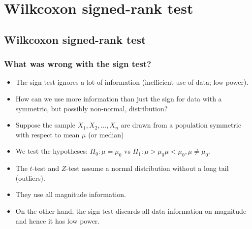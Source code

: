 \documentclass[a4paper]{article}
\begin{document}
\section{Wilkcoxon signed-rank test}\label{sec:14}
\subsection{Wilkcoxon signed-rank test}
\subsubsection{What was wrong with the sign test?}
\begin{itemize}
	\item The sign test ignores a lot of information (inefficient use of data; low power).\
	\item How can we use more information than just the sign for data with a symmetric, but possibly non-normal, distribution?
	\item Suppose the sample \( X_1,X_2,\dotsc,X_n \) are drawn from a population symmetric with respect to mean \( \mu \) (or median)
	\item We test the hypotheses: \( H_0: \mu = \mu_0 \) vs \( H_1: \mu > \mu_0 \mu < \mu_0, \mu \neq \mu_0 \).
	\item The \( t \)-test and \( Z \)-test assume a normal distribution without a long tail (outliers).
	\item They use all \textcolor{mygreen}{magnitude} information.
	\item On the other hand, the sign test discards all data information on \textcolor{mygreen}{magnitude} and hence it has low power.
\end{itemize}
\end{document}
